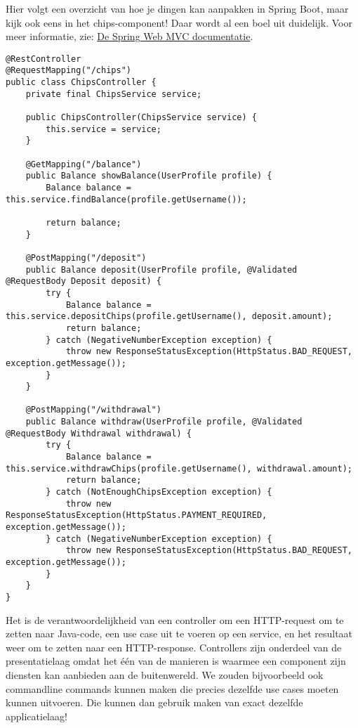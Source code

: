 Hier volgt een overzicht van hoe je dingen kan aanpakken in 
Spring Boot, maar kijk ook eens in het chips-component!
Daar wordt al een boel uit duidelijk. Voor meer informatie, zie:
\href{https://docs.spring.io/spring-framework/docs/5.3.8/reference/html/web.html#mvc-controller}{De Spring Web MVC documentatie}.

\begin{verbatim}
@RestController
@RequestMapping("/chips")
public class ChipsController {
    private final ChipsService service;

    public ChipsController(ChipsService service) {
        this.service = service;
    }

    @GetMapping("/balance")
    public Balance showBalance(UserProfile profile) {
        Balance balance = this.service.findBalance(profile.getUsername());

        return balance;
    }

    @PostMapping("/deposit")
    public Balance deposit(UserProfile profile, @Validated @RequestBody Deposit deposit) {
        try {
            Balance balance = this.service.depositChips(profile.getUsername(), deposit.amount);
            return balance;
        } catch (NegativeNumberException exception) {
            throw new ResponseStatusException(HttpStatus.BAD_REQUEST, exception.getMessage());
        }
    }

    @PostMapping("/withdrawal")
    public Balance withdraw(UserProfile profile, @Validated @RequestBody Withdrawal withdrawal) {
        try {
            Balance balance = this.service.withdrawChips(profile.getUsername(), withdrawal.amount);
            return balance;
        } catch (NotEnoughChipsException exception) {
            throw new ResponseStatusException(HttpStatus.PAYMENT_REQUIRED, exception.getMessage());
        } catch (NegativeNumberException exception) {
            throw new ResponseStatusException(HttpStatus.BAD_REQUEST, exception.getMessage());
        }
    }
}
\end{verbatim}

Het is de verantwoordelijkheid van een controller om een HTTP-request
om te zetten naar Java-code, een use case uit te voeren op een service, 
en het resultaat weer om te zetten naar een HTTP-response. 
Controllers zijn onderdeel van de presentatielaag omdat 
het één van de manieren is waarmee een component zijn diensten kan aanbieden 
aan de buitenwereld. We zouden bijvoorbeeld ook commandline commands kunnen maken 
die precies dezelfde use cases moeten kunnen uitvoeren. Die kunnen dan gebruik 
maken van exact dezelfde applicatielaag!

